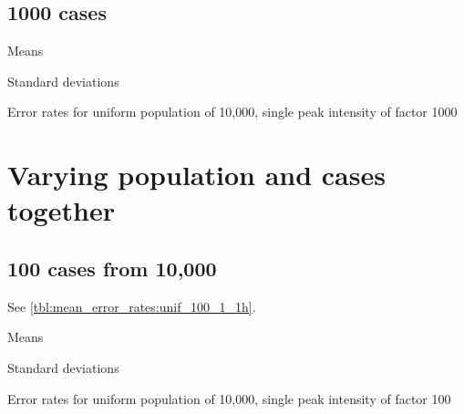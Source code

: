 \subsection{1000 cases}
\begin{table}[H]
\centering
\scriptsize

    \begin{subtable}{0.5\textwidth}
    
    \caption[]{Means} 
    \end{subtable}%
    \begin{subtable}{0.5\textwidth}
    
    \caption[]{Standard deviations} 
    \end{subtable}

\caption[]{Error rates for uniform population of 10,000, single peak intensity of factor 1000}
\label{tbl:mean_error_rates:unif_1000_1_1h}
\end{table}


\section{Varying population and cases together}

\subsection{100 cases from 10,000}

See \autoref{tbl:mean_error_rates:unif_100_1_1h}.

\begin{table}[H]
\centering
\scriptsize

    \begin{subtable}{0.5\textwidth}
    
    \caption[]{Means} 
    \end{subtable}%
    \begin{subtable}{0.5\textwidth}
    
    \caption[]{Standard deviations} 
    \end{subtable}

\caption[]{Error rates for uniform population of 10,000, single peak intensity of factor 100}
\label{tbl:mean_error_rates:unif_100_1_1h:2}
\end{table}

